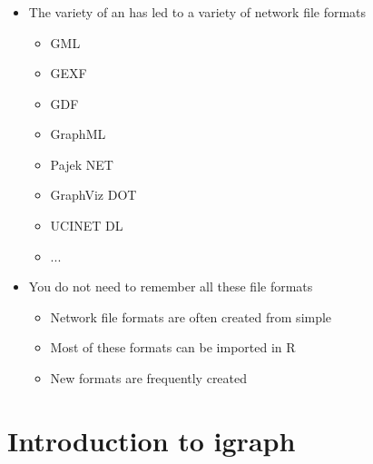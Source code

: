 \documentclass[8pt]{beamer}
\begin{document}

\begin{frame}
\frametitle{\insertsection}

\begin{itemize}
\item The variety of {\color{blue}{software packages}} an {\color{blue}{program languages}} has led to a variety of network file formats
    
    \begin{itemize}
    \item GML
    \item GEXF
    \item GDF
    \item GraphML
    \item Pajek NET
    \item GraphViz DOT
    \item UCINET DL
    \item ...
    \end{itemize}

\medskip
\medskip

\item You do not need to remember all these file formats 
    \begin{itemize}
    \item Network file formats are often created from simple {\color{blue}{tables of nodes and edges}}
    \item Most of these formats can be imported in R
    \item New formats are frequently created 
    \end{itemize}

\end{itemize}
\end{frame}





\section{Introduction to igraph}

\bgroup
{}
\begin{frame}[plain]{}
\begin{center}
\color{white}{\Huge\insertsection}
\end{center}
\end{frame}
\egroup
\end{document}
